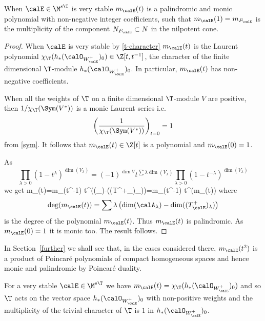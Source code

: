 \begin{corollary}
\notready\label{eqmult}
	When $\calE\in \M^{s
		\T}$ is very stable $m_{\calE}(t)$ is a palindromic and monic polynomial with non-negative integer coefficients, such that $m_{\calE}(1)=m_{F_\calE}$ is the multiplicity of the component $N_{F_\calE}\subset N$ in the nilpotent cone.
\end{corollary}
\begin{proof}
	When $\calE$ is very stable  by \eqref{t-character} $m_{\calE}(t)$ is the Laurent polynomial $\chi_\T(h_*(\calO_{W^+_\calE})_0)\in \Z[t,t^{-1}]$, the character of the finite dimensional $\T$-module $h_*(\calO_{W^+_\calE})_0$. In particular, $m_{\calE}(t)$ has non-negative coefficients.

	When all the weights of $\T$ on a finite dimensional $\T$-module $V$ are positive, then ${1/ \chi_{\T}(\Sym(V^*))}$ is a monic Laurent series i.e. $$\left({1\over \chi_{\T}(\Sym(V^*))}\right)_{t=0}=1$$ from \eqref{sym}. It follows that $m_{\calE}(t)\in \Z[t]$ is a polynomial and $m_{\calE}(0)=1$.

	As  $$\prod_{\lambda>0}{( 1- t^{\lambda})^{\dim(V_\lambda)}}=(-1)^{\dim V}t^{\sum \lambda\dim(V_\lambda)} \prod_{\lambda>0}{( 1- t^{-\lambda})^{\dim(V_\lambda)}}$$ we get  \beq\label{palindromic}m_{\calE}(t)=m_{\calE}(t^{-1}) t^{\sum \lambda\left(\dim(\calA_\lambda)-\dim((T^+_\calE)_\lambda)\right)}=m_{\calE}(t^{-1}) t^{\deg(m_{\calE}(t))}
	\eeq where $$\deg(m_{\calE}(t))=\sum \lambda\left(\dim(\calA_\lambda)-\dim((T^+_\calE)_\lambda)\right)$$ is the degree of the polynomial $m_{\calE}(t)$. Thus $m_{\calE}(t)$ is palindromic.  As $m_{\calE}(0)=1$  it is monic too. The result follows.
\end{proof}

\begin{remark}
\notready In Section~\ref{further} we shall see that, in the cases considered there, $m_{\calE}(t^2)$ is a product of Poincar\'e polynomials of compact homogeneous spaces and hence monic and palindromic by Poincar\'e duality.
\end{remark}

\begin{remark}
\notready For a very stable $\calE\in \M^{s\T}$ we have $m_{\calE}(t)=\chi_\T(h_*(\calO_{W^+_{\calE}})_0)$ and so $\T$ acts on the vector space $h_*(\calO_{W^+_{\calE}})_0$ with non-positive weights and the multiplicity of the trivial character of $\T$ is $1$ in $h_*(\calO_{W^+_{\calE}})_0$.

\end{remark}

